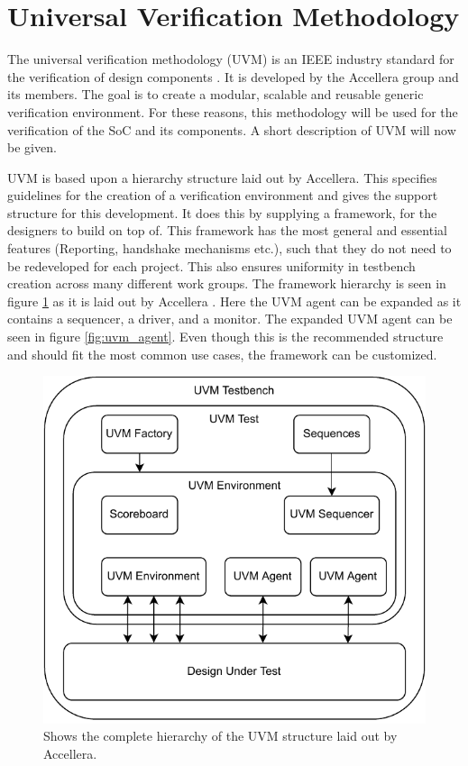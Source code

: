 \section{Universal Verification Methodology}
\label{uvm}
The universal verification methodology (UVM) is an IEEE industry standard for the verification of design components \cite{uvmAccelleraScope}. It is developed by the Accellera group and its members. The goal is to create a modular, scalable and reusable generic verification environment. For these reasons, this methodology will be used for the verification of the SoC and its components. A short description of UVM will now be given.

UVM is based upon a hierarchy structure laid out by Accellera. This specifies guidelines for the creation of a verification environment and gives the support structure for this development. It does this by supplying a framework, for the designers to build on top of. This framework has the most general and essential features (Reporting, handshake mechanisms etc.), such that they do not need to be redeveloped for each project. This also ensures uniformity in testbench creation across many different work groups. The framework hierarchy is seen in figure \ref{fig:uvm_hierarchy} as it is laid out by Accellera \cite{uvmUserGuide}. Here the UVM agent can be expanded as it contains a sequencer, a driver, and a monitor. The expanded UVM agent can be seen in figure \ref{fig:uvm_agent}. Even though this is the recommended structure and should fit the most common use cases, the framework can be customized. 

\begin{figure}[H]
    \centering
    \includegraphics[width=0.6\linewidth]{subfiles/imgs/uvmHierarchy.drawio.pdf}
    \caption{Shows the complete hierarchy of the UVM structure laid out by Accellera.}
    \label{fig:uvm_hierarchy}
\end{figure}

